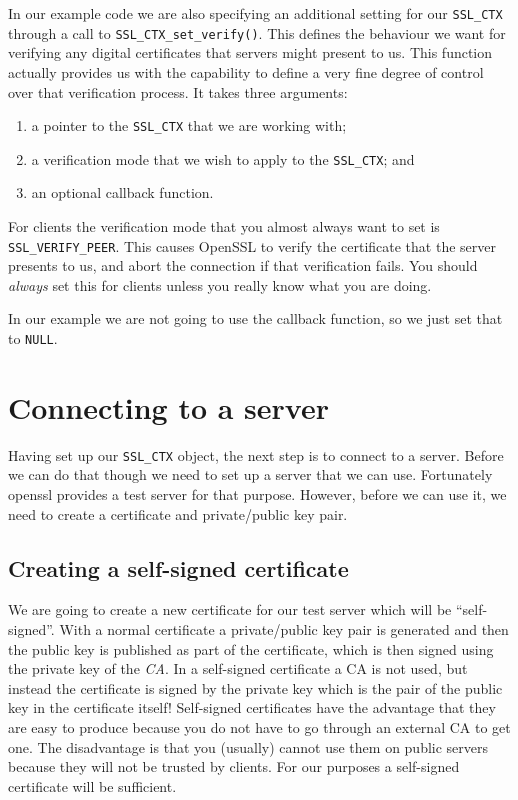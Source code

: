 In our example code we are also specifying an additional setting for our
\verb!SSL_CTX! through a call to \verb!SSL_CTX_set_verify()!. This defines the 
behaviour we want for verifying any digital certificates that servers might
present to us. This function actually provides us with the capability to define 
a very fine degree of control over that verification process. It takes three 
arguments:
\begin{enumerate}
\item a pointer to the \texttt{SSL\_CTX} that we are working with;
\item a verification mode that we wish to apply to the \texttt{SSL\_CTX}; and
\item an optional callback function.
\end{enumerate}

For clients the verification mode that you almost always want to set is 
\verb!SSL_VERIFY_PEER!. This causes OpenSSL to verify the certificate that the 
server presents to us, and abort the connection if that verification fails. You
should \emph{always} set this for clients unless you really know what you are 
doing.

In our example we are not going to use the callback function, so we just set 
that to \verb!NULL!.

\section {Connecting to a server}

Having set up our \verb!SSL_CTX! object, the next step is to connect to a
server.  Before we can do that though we need to set up a server that we can
use.  Fortunately openssl provides a test server for that purpose. However,
before we  can use it, we need to create a certificate and private/public key
pair.

\subsection {Creating a self-signed certificate}

We are going to create a new certificate for our test server which will be 
``self-signed''. With a normal certificate a private/public key pair is
generated and then the public key is published as part of the certificate, 
which is then signed using the private key of the \emph{CA}. In a self-signed 
certificate a CA is not used, but instead the certificate is signed by the 
private key which is the pair of the public key in the certificate itself! 
Self-signed certificates have the advantage that they are easy to produce 
because you do not have to go through an external CA to get one. The 
disadvantage is that you (usually) cannot use them on public servers because 
they will not be trusted by clients. For our purposes a self-signed certificate 
will be sufficient.

